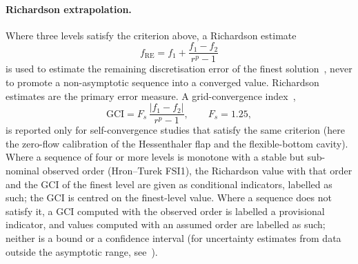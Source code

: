 \paragraph{Richardson extrapolation.}
Where three levels satisfy the criterion above, a Richardson estimate
\begin{equation}
	f_\mathrm{RE} = f_1 + \frac{f_1 - f_2}{r^{p} - 1}
	\label{eq:richardson}
\end{equation}
is used to estimate the remaining discretisation error of the finest solution~\citep{Richardson1911, Roache1998}, never to promote a non-asymptotic sequence into a converged value.
Richardson estimates are the primary error measure.
A grid-convergence index~\citep{Roache1994, Roache1998, Celik2008},
\begin{equation}
	\mathrm{GCI} = F_s\,\frac{|f_1 - f_2|}{r^{p} - 1}, \qquad F_s = 1.25,
	\label{eq:gci}
\end{equation}
is reported only for self-convergence studies that satisfy the same criterion (here the zero-flow calibration of the Hessenthaler flap and the flexible-bottom cavity). Where a sequence of four or more levels is monotone with a stable but sub-nominal observed order (Hron--Turek FSI1), the Richardson value with that order and the GCI of the finest level are given as conditional indicators, labelled as such; the GCI is centred on the finest-level value.
Where a sequence does not satisfy it, a GCI computed with the observed order is labelled a provisional indicator, and values computed with an assumed order are labelled as such; neither is a bound or a confidence interval (for uncertainty estimates from data outside the asymptotic range, see~\citet{Eca2014}).

